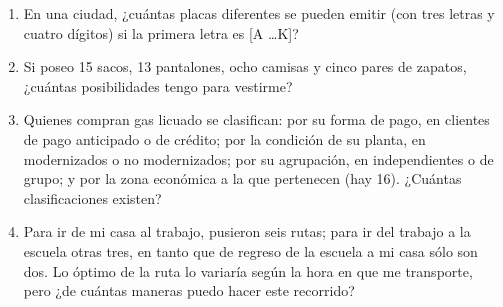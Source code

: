 \begin{Ejer}
\begin{enumerate}
\item En una ciudad, ¿cu\'antas placas diferentes se pueden emitir (con tres letras y cuatro d\'igitos) si la primera letra es [A \dots K]?

\item Si poseo 15 sacos, 13 pantalones, ocho camisas y cinco pares de zapatos, ¿cu\'antas posibilidades tengo para vestirme?

\item Quienes compran gas licuado se clasifican: por su forma de pago, en clientes de pago anticipado o de cr\'edito; por la condici\'on de su planta, en modernizados o no modernizados; por su agrupaci\'on, en independientes o de grupo; y por la zona econ\'omica a la que pertenecen (hay 16). ¿Cu\'antas clasificaciones existen?

\item Para ir de mi casa al trabajo, pusieron seis rutas; para ir del trabajo a la escuela otras tres, en tanto que de regreso de la escuela a mi casa s\'olo son dos. Lo \'optimo de la ruta lo variar\'ia seg\'un la hora en que me transporte, pero ¿de cu\'antas maneras puedo hacer este recorrido?

\end{enumerate}
\end{Ejer}

